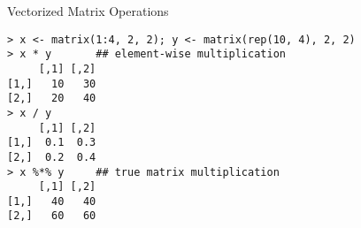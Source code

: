\documentclass[aspectratio=169]{beamer}
\begin{document}
\begin{frame}[fragile]{Vectorized Matrix Operations}
\begin{verbatim}
> x <- matrix(1:4, 2, 2); y <- matrix(rep(10, 4), 2, 2)
> x * y       ## element-wise multiplication
     [,1] [,2]
[1,]   10   30
[2,]   20   40
> x / y
     [,1] [,2]
[1,]  0.1  0.3
[2,]  0.2  0.4
> x %*% y     ## true matrix multiplication
     [,1] [,2]
[1,]   40   40
[2,]   60   60
\end{verbatim}
\end{frame}
\end{document}
